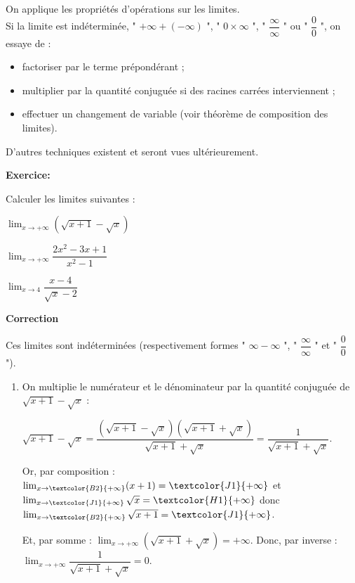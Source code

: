 \documentclass{cornouaille}
\begin{document}
\begin{methode}
On applique les propriétés d'opérations sur les limites.\\
Si la limite est indéterminée, " $+\infty+(-\infty)$ ", " $0\times\infty$ ", " $\dfrac{\infty}{\infty}$ " ou " $\dfrac{0}{0}$ ", on essaye de :
\begin{itemize}
\item factoriser par le terme prépondérant ;
\item multiplier par la quantité conjuguée si des racines carrées interviennent ;
\item effectuer un changement de variable (voir théorème de
  composition des limites).
\end{itemize}
D'autres techniques existent et seront vues ultérieurement.
  

\textbf{Exercice:}

 \label{meth_limite_fonction}
Calculer les limites suivantes :
\begin{colenumerate}{3}
\item $\lim_{x\to+\infty}\left(\sqrt{x+1}-\sqrt{x}\right)$
\item $\lim_{x\to+\infty}\dfrac{2x^2-3x+1}{x^2-1}$
\item $\lim_{x\to4}\dfrac{x - 4}{\sqrt{x} - 2}$
\end{colenumerate}

  

\textbf{Correction}


Ces  limites sont indéterminées (respectivement formes " $\infty-\infty$ ", " $\dfrac{\infty}{\infty}$ " et " $\dfrac{0}{0}$ ").
  \begin{enumerate}
  \item On multiplie le numérateur et le dénominateur par la quantité
    conjuguée de $\sqrt{x+1}-\sqrt{x}$ :\par
    $\sqrt{x+1}-\sqrt{x}=\dfrac{\left(\sqrt{x+1}-\sqrt{x}\right)\left(\sqrt{x+1}+\sqrt{x}\right)}{\sqrt{x+1}+\sqrt{x}}=\dfrac{1}{\sqrt{x+1}+\sqrt{x}}$.\par
    Or, par composition :
    $\lim_{x\to\textcolor{B2}{+\infty}}(x+1)=\textcolor{J1}{+\infty}$
    et
    $\lim_{x\to\textcolor{J1}{+\infty}}\sqrt{x}=\textcolor{H1}{+\infty}$
    donc
    $\lim_{x\to\textcolor{B2}{+\infty}}\sqrt{x+1}=\textcolor{J1}{+\infty}$.\par
    Et, par somme :
    $\lim_{x\to+\infty}\left(\sqrt{x+1}+\sqrt{x}\right)=+\infty$. Donc,
    par inverse :
    $\lim_{x\to+\infty}\dfrac{1}{\sqrt{x+1}+\sqrt{x}}=0$.




\end{enumerate}
\end{methode}
\end{document}

